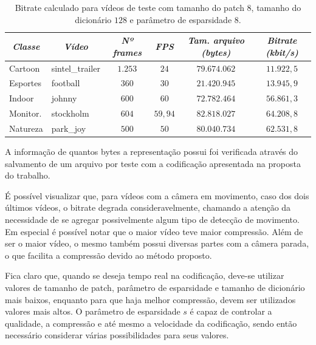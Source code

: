 \documentclass[cic,tc]{iiufrgs}
\begin{document}
\begin{table}[h]
    \caption{Bitrate calculado para vídeos de teste com tamanho do patch $8$, tamanho do 
    dicionário $128$ e parâmetro de esparsidade $8$.}
    \centering
        \begin{tabular}{|l|l|c|c|c|c|}
          \hline
          \multicolumn{1}{|c}{\textit{Classe}} & 
          \multicolumn{1}{|c}{\textit{Vídeo}} & 
          \multicolumn{1}{|c}{\textit{Nº frames}} & 
          \multicolumn{1}{|c}{\textit{FPS}} & 
          \multicolumn{1}{|c}{\textit{Tam. arquivo (bytes)}} & 
          \multicolumn{1}{|c|}{\textit{Bitrate (kbit/s)}} \\
          \hline
          \hline
          Cartoon & sintel\_trailer & $1.253$ & $24$ & $79.674.062$ & $11.922,5$ \\
          Esportes & football &  $360$ & $30$ & $21.420.945$ & $13.945,9$ \\
          Indoor & johnny  &   $600$ & $60$ & $72.782.464$ & $56.861,3$ \\
          Monitor. & stockholm & $604$ & $59,94$ & $82.818.027$ & $64.208,8$ \\
          Natureza & park\_joy & $500$ & $50$ & $80.040.734$ & $62.531,8$ \\
          \hline
        \end{tabular}
    \label{tbl:bitrate}
\end{table}

A informação de quantos bytes a representação possui foi verificada através do salvamento
de um arquivo por teste com a codificação apresentada na proposta do trabalho.

É possível visualizar que, para vídeos com a câmera em movimento, caso dos dois últimos vídeos,
o bitrate degrada consideravelmente, chamando a atenção da necessidade de se agregar possivelmente
algum tipo de detecção de movimento.
Em especial é possível notar que o maior vídeo teve maior compressão.
Além de ser o maior vídeo, o mesmo também possui diversas partes com a câmera parada, 
o que facilita a compressão devido ao método proposto.

Fica claro que, quando se deseja tempo real na codificação, deve-se utilizar valores 
de tamanho de patch, parâmetro de esparsidade e tamanho de dicionário mais baixos, enquanto para que haja melhor compressão, 
devem ser utilizados valores mais altos.
O parâmetro de esparsidade $s$ é capaz de controlar a qualidade, a compressão e até mesmo a velocidade 
da codificação, sendo então necessário considerar várias possibilidades para seus valores.
\end{document}
